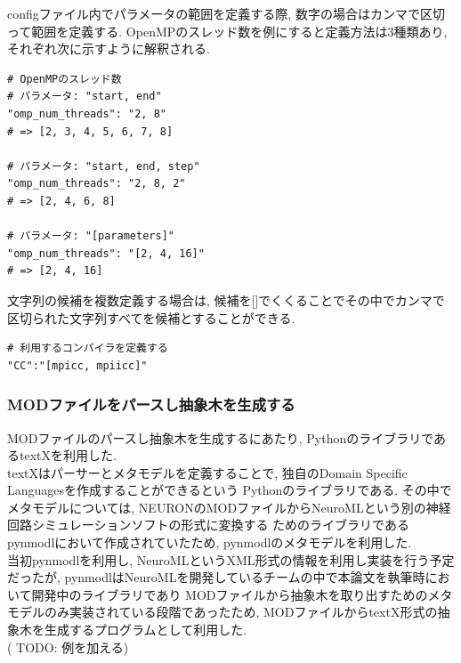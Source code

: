 configファイル内でパラメータの範囲を定義する際, 数字の場合はカンマで区切って範囲を定義する.
OpenMPのスレッド数を例にすると定義方法は3種類あり, それぞれ次に示すように解釈される.\\
{\footnotesize
\begin{lstlisting}[numbers=none, caption=数値パラメータの定義]
# OpenMPのスレッド数
# パラメータ: "start, end"
"omp_num_threads": "2, 8"
# => [2, 3, 4, 5, 6, 7, 8]

# パラメータ: "start, end, step"
"omp_num_threads": "2, 8, 2"
# => [2, 4, 6, 8]

# パラメータ: "[parameters]"
"omp_num_threads": "[2, 4, 16]"
# => [2, 4, 16]
\end{lstlisting}
}

文字列の候補を複数定義する場合は,
候補を[]でくくることでその中でカンマで区切られた文字列すべてを候補とすることができる.
{\footnotesize
\begin{lstlisting}[numbers=none, caption=文字列パラメータの定義]
# 利用するコンパイラを定義する
"CC":"[mpicc, mpiicc]"

\end{lstlisting}
}
\subsubsection{MODファイルをパースし抽象木を生成する}
\label{sec:simulator-mod-parse}
MODファイルのパースし抽象木を生成するにあたり, PythonのライブラリであるtextX\cite{textX-repo}を利用した.\\
textXはパーサーとメタモデルを定義することで, 独自のDomain Specific Languagesを作成することができるという
Pythonのライブラリである.
その中でメタモデルについては, NEURONのMODファイルからNeuroMLという別の神経回路シミュレーションソフトの形式に変換する
ためのライブラリであるpynmodl\cite{pynmodl-repo}において作成されていたため, pynmodlのメタモデルを利用した.\\
当初pynmodlを利用し, NeuroMLというXML形式の情報を利用し実装を行う予定だったが,
pynmodlはNeuroMLを開発しているチームの中で本論文を執筆時において開発中のライブラリであり
MODファイルから抽象木を取り出すためのメタモデルのみ実装されている段階であったため,
MODファイルからtextX形式の抽象木を生成するプログラムとして利用した.\\

( TODO: 例を加える)

